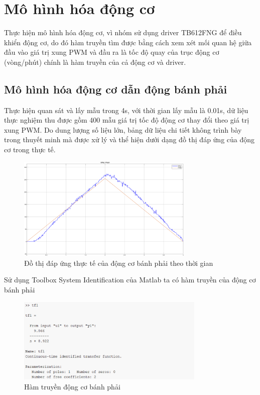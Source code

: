      \section{Mô hình hóa động cơ}
          \hspace*{0.6cm}Thực hiện mô hình hóa động cơ, vì nhóm sử dụng driver TB612FNG để điều khiển động cơ, do đó hàm truyền tìm được bằng cách xem xét mối quan hệ giữa đầu vào giá trị xung PWM và đầu ra là tốc độ quay của trục động cơ (vòng/phút) chính là hàm truyền của cả động cơ và driver.   
          \subsection{Mô hình hóa động cơ dẫn động bánh phải}    
               \hspace*{0.6cm}Thực hiện quan sát và lấy mẫu trong 4s, với thời gian lấy mẫu là 0.01s, dữ liệu thực nghiệm thu được gồm 400 mẫu giá trị tốc độ động cơ thay đổi theo giá trị xung PWM. Do dung lượng số liệu lớn, 
               bảng dữ liệu chi tiết không trình bày trong thuyết minh mà được xử lý và thể hiện dưới dạng đồ thị đáp ứng của động cơ trong thực tế. 
               \begin{figure}[H]
                    \centering
                    \includegraphics[width=0.75\textwidth]{pictures/chapter5/CJGB1_response.png}
                    \caption{Đồ thị đáp ứng thực tế của động cơ bánh phải theo thời gian}
                    \label{CJGB1_response}
               \end{figure}  
               \hspace*{0.6cm}Sử dụng Toolbox System Identification của Matlab ta có hàm truyền của động cơ bánh phải 
               \begin{figure}[H]
                    \centering
                    \includegraphics[width=0.8\textwidth]{pictures/chapter5/CJGB1_tf.png}
                    \caption{Hàm truyền động cơ bánh phải}
                    \label{CJGB1_tf}
               \end{figure} 
